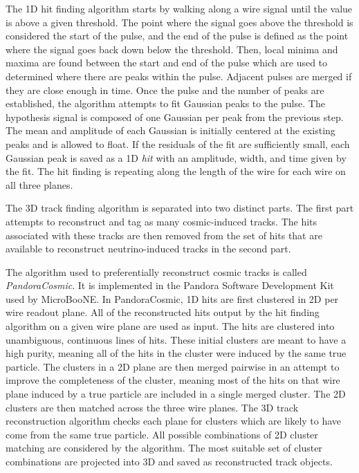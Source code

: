     The 1D hit finding algorithm starts by walking along a wire signal until
    the value is above a given threshold. The point where the signal goes above
    the threshold is considered the start of the pulse, and the end of the
    pulse is defined as the point where the signal goes back down below the
    threshold.  Then, local minima and maxima are found between the start and
    end of the pulse which are used to determined where there are peaks within
    the pulse.  Adjacent pulses are merged if they are close enough in time.
    Once the pulse and the number of peaks are established, the algorithm
    attempts to fit Gaussian peaks to the pulse. The hypothesis signal is
    composed of one Gaussian per peak from the previous step. The mean and
    amplitude of each Gaussian is initially centered at the existing peaks and
    is allowed to float. If the residuals of the fit are sufficiently small,
    each Gaussian peak is saved as a 1D \textit{hit} with an amplitude, width,
    and time given by the fit. The hit finding is repeating along the length of
    the wire for each wire on all three planes.

    The 3D track finding algorithm is separated into two distinct parts. The
    first part attempts to reconstruct and tag as many cosmic-induced tracks.
    The hits associated with these tracks are then removed from the set of hits
    that are available to reconstruct neutrino-induced tracks in the second
    part. 

    The algorithm used to preferentially reconstruct cosmic tracks is called
    \textit{PandoraCosmic}. It is implemented in the Pandora Software
    Development Kit~\cite{Acciarri:2017hat} used by MicroBooNE. In
    PandoraCosmic, 1D hits are first clustered in 2D per wire readout plane.
    All of the reconstructed hits output by the hit finding algorithm on a
    given wire plane are used as input. The hits are clustered into
    unambiguous, continuous lines of hits. These initial clusters are meant to
    have a high purity, meaning all of the hits in the cluster were induced by
    the same true particle. The clusters in a 2D plane are then merged pairwise
    in an attempt to improve the completeness of the cluster, meaning most of
    the hits on that wire plane induced by a true particle are included in a
    single merged cluster. The 2D clusters are then matched across the three
    wire planes. The 3D track reconstruction algorithm checks each plane for
    clusters which are likely to have come from the same true particle.  All
    possible combinations of 2D cluster matching are considered by the
    algorithm. The most suitable set of cluster combinations are projected into
    3D and saved as reconstructed track objects.

